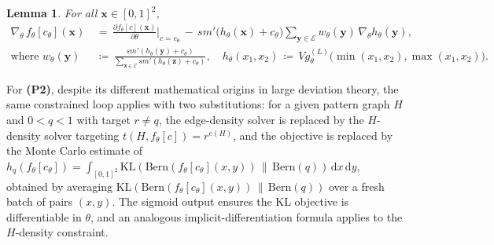 \documentclass{article}
\theoremstyle{plain}
\newtheorem{lemma}{Lemma}[section]
\theoremstyle{definition}
\theoremstyle{remark}
\begin{document}
\begin{lemma}\label{lem:implicitdifferentiation}
For all $\mathbf{x} \in [0,1]^2$,
\begin{align*}
\nabla_\theta\, f_\theta[c_\theta](\mathbf{x})
\,&=\, \frac{\partial f_\theta[c](\mathbf{x})}{\partial \theta}\bigg|_{c = c_\theta}
\,-\, \mathit{sm}'\bigl(h_\theta(\mathbf{x}) + c_\theta\bigr)
\sum_{\mathbf{y} \in \mathcal{E}} w_\theta(\mathbf{y})\, \nabla_\theta h_\theta(\mathbf{y}),
\\
\text{where }
w_\theta(\mathbf{y}) \,&\coloneqq\, \frac{\mathit{sm}'(h_\theta(\mathbf{y}) + c_\theta)}{\sum_{\mathbf{z} \in \mathcal{E}} \mathit{sm}'(h_\theta(\mathbf{z}) + c_\theta)},
\quad
h_\theta(x_1, x_2) \,\coloneqq\, V g_\theta^{(L)}\!\bigl(\min(x_1, x_2), \max(x_1, x_2)\bigr).
\end{align*}
\end{lemma}

For \textbf{(P2)}, despite its different mathematical origins in large deviation theory, the same constrained loop applies with two substitutions: for a given pattern graph $H$ and $0<q<1$ with target $r \neq q$, the edge-density solver is replaced by the $H$-density solver targeting $t(H, f_\theta[c]) = r^{e(H)}$, and the objective is replaced by the Monte Carlo estimate of $h_q(f_\theta[c_\theta])=\int_{[0,1]^2} \mathrm{KL}(\mathrm{Bern}(f_\theta[c_\theta](x,y))\,\|\,\mathrm{Bern}(q))\,\mathrm{d}x\,\mathrm{d}y$, obtained by averaging $\mathrm{KL}(\mathrm{Bern}(f_\theta[c_\theta](x,y))\,\|\,\mathrm{Bern}(q))$ over a fresh batch of pairs $(x,y)$. The sigmoid output ensures the KL objective is differentiable in $\theta$, and an analogous implicit-differentiation formula applies to the $H$-density constraint.
\end{document}
